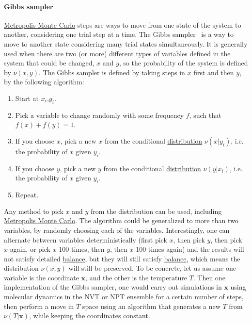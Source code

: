 \documentclass[9pt,review]{livecoms}
\newcommand{\vx}{\mathbf{x}}
\begin{document}
\hypertarget{ref:GibbsSampler} {\paragraph{Gibbs sampler}}
\hyperlink{ref:MetropolisMonteCarlo} {Metropolis Monte Carlo} steps are ways to move from one state of the system to another, considering one trial step at a time.  The Gibbs sampler~\cite{shirts_gibbssamp} is a  way to move to another state considering many trial states simultaneously. It is generally used when there are two (or more) different types of variables defined in the system that could be changed, $x$ and $y$, so the probability of the system is defined by $\nu(x,y)$. The Gibbs sampler is defined by taking steps in $x$ first and then $y$, by the following algorithm:
\begin{enumerate}
\item Start at $x_i$,$y_i$.
\item Pick a variable to change randomly with some frequency $f$, such that $f(x)+f(y)=1$.
\item If you choose $x$, pick a new $x$ from the conditional \hyperlink{ref:Distribution} {distribution} $\nu(x|y_i)$, i.e. the probability of $x$ given $y_i$.
\item If you choose $y$, pick a new $y$ from the conditional \hyperlink{ref:Distribution} {distribution} $\nu(y|x_i)$, i.e. the probability of $x$ given $y_i$.
\item Repeat.
\end{enumerate}
Any method to pick $x$ and $y$ from the distribution can be used, including \hyperlink{ref:MetropolisMonteCarlo} {Metropolis Monte Carlo}. The algorithm could be generalized to more than two variables, by randomly choosing each of the variables. Interestingly, one can alternate between variables deterministically (first pick $x$, then pick $y$, then pick $x$ again, or pick $x$ 100 times, then $y$, then $x$ 100 times again) and the results will not satisfy detailed \hyperlink{ref:Balance} {balance}, but they will still satisfy \hyperlink{ref:Balance} {balance}, which means the distribution $\nu(x,y)$ will still be preserved.
To be concrete, let us assume one variable is the coordinate $\vx$, and the other is the temperature $T$. Then one implementation of the Gibbs sampler, one would carry out simulations in $\vx$ using molecular dynamics in the NVT or NPT \hyperlink{ref:Ensemble} {ensemble} for a certain number of steps, then perform a move in $T$ space using an algorithm that generates a new $T$ from $\nu(T|\vx)$, while keeping the coordinates constant.
\end{document}
